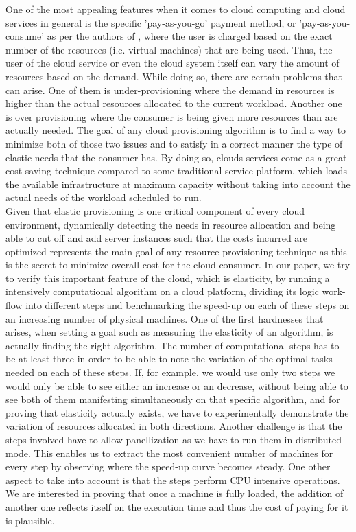 \documentclass[conference]{IEEEtran}
\begin{document}
One of the most appealing features when it comes to cloud computing and cloud services in general is the specific 'pay-as-you-go' payment method, or 'pay-as-you-consume' as per the authors of \cite{ibrahim2011towards}, where the user is charged based on the exact number of the resources (i.e. virtual machines) that are being used. Thus, the user of the cloud service or even the cloud system itself can vary the amount of resources based on the demand. While doing so, there are certain problems that can arise. One of them is under-provisioning where the demand in resources is higher than the actual resources allocated to the current workload. Another one is over provisioning where the consumer is being given more resources than are actually needed. The goal of any cloud provisioning algorithm is to find a way to minimize both of those two issues and to satisfy in a correct manner the type of elastic needs that the consumer has. By doing so, clouds services come as a great cost saving technique compared to some traditional service platform,  which loads the available infrastructure at maximum capacity without taking into account the actual needs of the workload scheduled to run.\\

Given that elastic provisioning is one critical component of every cloud environment, dynamically detecting the needs in resource allocation and being able to cut off and add server instances such that the costs incurred are optimized represents the main goal of any resource provisioning technique as this is the secret to minimize overall cost for the cloud consumer. In our paper, we try to verify this important feature of the cloud, which is elasticity, by running a intensively computational algorithm on a cloud platform, dividing its logic work-flow into different steps and benchmarking the speed-up on each of these steps on an increasing number of physical machines. One of the first hardnesses that arises, when setting a goal such as measuring the elasticity of an algorithm, is actually finding the right algorithm. The number of computational steps has to be at least three in order to be able to note the variation of the optimal tasks needed on each of these steps. If, for example, we would use only two steps we would only be able to see either  an increase or an decrease, without being able to see both of them manifesting simultaneously on that specific algorithm, and for proving that elasticity actually exists, we have to experimentally demonstrate the variation of resources allocated in both directions. Another challenge is that the steps involved have to allow panellization as we have to run them in distributed mode. This enables us to extract the most convenient number of machines for every step by observing where the speed-up curve becomes steady. One other aspect to take into account is that the steps perform CPU intensive operations. We are interested in proving that once a machine is fully loaded, the addition of another one reflects itself on the execution time and thus the cost of paying for it is plausible.\\
\end{document}
